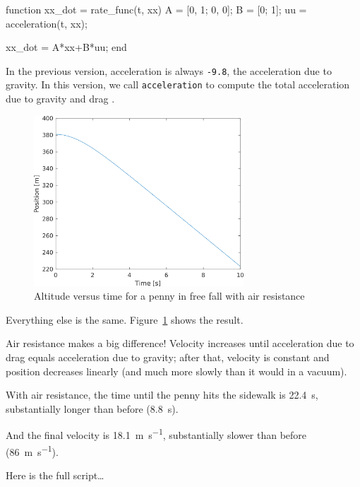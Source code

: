 \begin{code}
function xx_dot = rate_func(t, xx)
    A = [0, 1; 0, 0];
    B = [0; 1];
    uu = acceleration(t, xx);
    
    xx_dot = A*xx+B*uu;
end
\end{code}

In the previous version, acceleration is always \lstinline{-9.8}, the acceleration due to gravity.
In this version, we call \lstinline{acceleration} to compute the total acceleration due to gravity and drag .

\begin{figure}[ht]
\centerline{\includegraphics[width=0.7\textwidth]{../code/chap11/penny_event_drag.png}}
\caption{Altitude versus time for a penny in free fall with air resistance}
\label{fig:penny2}
\end{figure}

Everything else is the same.  Figure~\ref{fig:penny2} shows the result.

Air resistance makes a big difference! Velocity increases until
acceleration due to drag equals acceleration due to gravity; after that, velocity is constant and position decreases linearly (and much more slowly than it would in a vacuum).

With air resistance, the time until the penny hits the sidewalk is \SI{22.4}{\second}, substantially longer than before (\SI{8.8}{\second}).

And the final velocity is \SI{18.1}{\meter \per \second}, substantially slower than before (\SI{86}{\meter \per \second}).

Here is the full script\dots


